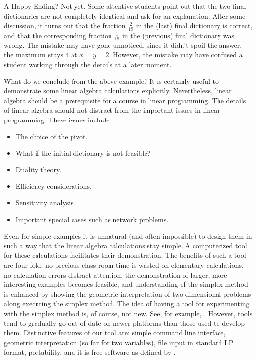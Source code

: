 \documentclass[ukenglish,a4]{article}
\begin{document}
A Happy Ending? Not yet. Some attentive students point out that the two final dictionaries
are not completely identical and ask for an explanation. After some discussion, it turns
out that the fraction $\frac{2}{19}$ in the (last) final dictionary is correct,
and that the corresponding fraction $\frac{1}{19}$ in the (previous) final dictionary was wrong.
The mistake may have gone unnoticed, since it didn't spoil the answer, the maximum stays
$4$ at $x=y=2$. However, the mistake may have confused a student working through the details at a later moment.

\label{motivation}
What do we conclude from the above example? It is certainly useful to demonstrate some
linear algebra calculations explicitly. Nevertheless, linear algebra should be a prerequisite for a course
in linear programming. The details of linear algebra should not distract from the important
issues in linear programming. These issues include:
\begin{itemize}
\item The choice of the pivot.
\item What if the initial dictionary is not feasible?
\item Duality theory.
\item Efficiency considerations.
\item Sensitivity analysis.
\item Important special cases such as network problems.
\end{itemize}
Even for simple examples it is unnatural (and often impossible)
to design them in such a way that the linear algebra calculations stay simple.
A computerized tool for these calculations facilitates their demonstration.
The benefits of such a tool are four-fold: no precious class-room time is wasted
on elementary calculations, no calculation errors distract attention,
the demonstration of larger, more interesting examples becomes feasible, and 
understanding of the simplex method is enhanced by showing the geometric interpretation of two-dimensional problems along executing the simplex method.
The idea of having a tool
for experimenting with the simplex method is, of course, not new. 
See, for example, \cite{SimplexPivotTool, AdvancedPivotTool}.
However, tools tend to gradually go out-of-date on newer platforms
than those used to develop them. Distinctive features of our tool are: 
simple command line interface,
geometric interpretation (so far for two variables),  
file input in standard LP format,
portability, 
and it is free software as defined by \cite{freesw}.
\end{document}
